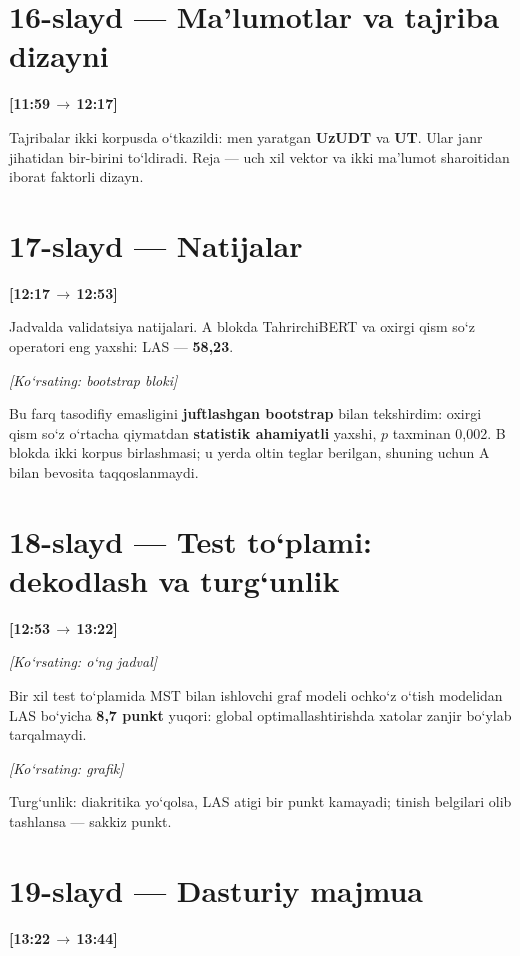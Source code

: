 \documentclass[14pt,a4paper]{extarticle}
\let\origsection\section
\renewcommand{\section}{\Needspace*{9\baselineskip}\origsection}
\newcommand{\timing}[2]{%
   \par\nobreak\noindent\textbf{[#1\,$\to$\,#2]}\par\vspace{0.3em}}
\newcommand{\pointto}[1]{\par\vspace{0.3em}\noindent\textit{\small
   [Ko‘rsating: #1]}\par}
\begin{document}
\section*{16-slayd --- Ma’lumotlar va tajriba dizayni}
\timing{11:59}{12:17}

Tajribalar ikki korpusda o‘tkazildi: men yaratgan \textbf{UzUDT} va \textbf{UT}. Ular
janr jihatidan bir-birini to‘ldiradi. Reja --- uch xil vektor va ikki ma’lumot
sharoitidan iborat faktorli dizayn.

\section*{17-slayd --- Natijalar}
\timing{12:17}{12:53}

Jadvalda validatsiya natijalari. A blokda TahrirchiBERT va oxirgi qism so‘z
operatori eng yaxshi: LAS --- \textbf{58,23}.

\pointto{bootstrap bloki}

Bu farq tasodifiy emasligini \textbf{juftlashgan bootstrap} bilan tekshirdim: oxirgi
qism so‘z o‘rtacha qiymatdan \textbf{statistik ahamiyatli} yaxshi, $p$ taxminan 0,002.
B blokda ikki korpus birlashmasi; u yerda oltin teglar berilgan, shuning uchun A
bilan bevosita taqqoslanmaydi.

\section*{18-slayd --- Test to‘plami: dekodlash va turg‘unlik}
\timing{12:53}{13:22}

\pointto{o‘ng jadval}

Bir xil test to‘plamida MST bilan ishlovchi graf modeli ochko‘z o‘tish modelidan
LAS bo‘yicha \textbf{8,7 punkt} yuqori: global optimallashtirishda xatolar zanjir
bo‘ylab tarqalmaydi.

\pointto{grafik}

Turg‘unlik: diakritika yo‘qolsa, LAS atigi bir punkt kamayadi; tinish belgilari
olib tashlansa --- sakkiz punkt.

\section*{19-slayd --- Dasturiy majmua}
\timing{13:22}{13:44}
\end{document}
